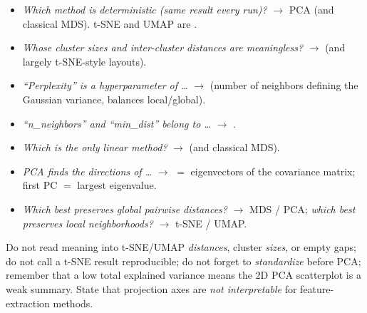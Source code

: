 \begin{exambox}
\begin{itemize}
\item \emph{Which method is deterministic (same result every run)?} $\to$ PCA
      (and classical MDS). t-SNE and UMAP are .
\item \emph{Whose cluster sizes and inter-cluster distances are meaningless?}
      $\to$  (and largely t-SNE-style layouts).
\item \emph{``Perplexity'' is a hyperparameter of \dots} $\to$ 
      (number of neighbors defining the Gaussian variance, balances local/global).
\item \emph{``n\_neighbors'' and ``min\_dist'' belong to \dots} $\to$ .
\item \emph{Which is the only linear method?} $\to$  (and classical MDS).
\item \emph{PCA finds the directions of \dots} $\to$  $=$
      eigenvectors of the covariance matrix; first PC $=$ largest eigenvalue.
\item \emph{Which best preserves global pairwise distances?} $\to$ MDS / PCA;
      \emph{which best preserves local neighborhoods?} $\to$ t-SNE / UMAP.
\end{itemize}
\end{exambox}

\begin{pitfall}
Do not read meaning into t-SNE/UMAP \emph{distances}, cluster \emph{sizes}, or
empty gaps; do not call a t-SNE result reproducible; do not forget to
\emph{standardize} before PCA; remember that a low total explained variance means
the 2D PCA scatterplot is a weak summary. State that projection axes are
\emph{not interpretable} for feature-extraction methods.
\end{pitfall}
